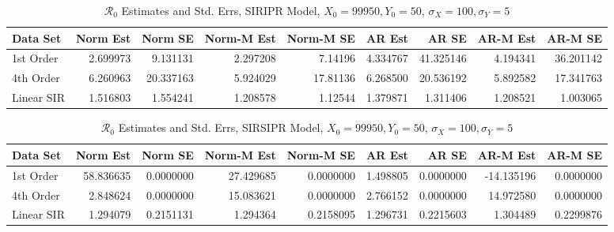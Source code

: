 \documentclass[12pt]{article}
\newcommand{\rr}{\ensuremath{\mathcal{R}_0}}
\begin{document}
\begin{table}[H]
	
	\caption{\label{tab:}$\rr$ Estimates and Std. Errs, SIRIPR Model,
		$X_0 = 99950, Y_0 = 50$, $\sigma_X = 100, \sigma_Y = 5$}
	\centering
	\begin{footnotesize}
	\begin{tabular}[t]{l|r|r|r|r|r|r|r|r}
		\hline
		Data Set & Norm Est & Norm SE & Norm-M Est & Norm-M SE & AR Est & AR SE & AR-M Est & AR-M SE\\
		\hline
		1st Order & 2.699973 & 9.131131 & 2.297208 & 7.14196 & 4.334767 & 41.325146 & 4.194341 & 36.201142\\
		\hline
		4th Order & 6.260963 & 20.337163 & 5.924029 & 17.81136 & 6.268500 & 20.536192 & 5.892582 & 17.341763\\
		\hline
		Linear SIR & 1.516803 & 1.554241 & 1.208578 & 1.12544 & 1.379871 & 1.311406 & 1.208521 & 1.003065\\
		\hline
	\end{tabular}
\end{footnotesize}
\end{table}
\begin{table}[H]
	
	\caption{\label{tab:}$\rr$ Estimates and Std. Errs, SIRSIPR Model,
		$X_0 = 99950, Y_0 = 50$, $\sigma_X = 100, \sigma_Y = 5$}
	\centering
	\begin{footnotesize}
	\begin{tabular}[t]{l|r|r|r|r|r|r|r|r}
		\hline
		Data Set & Norm Est & Norm SE & Norm-M Est & Norm-M SE & AR Est & AR SE & AR-M Est & AR-M SE\\
		\hline
		1st Order & 58.836635 & 0.0000000 & 27.429685 & 0.0000000 & 1.498805 & 0.0000000 & -14.135196 & 0.0000000\\
		\hline
		4th Order & 2.848624 & 0.0000000 & 15.083621 & 0.0000000 & 2.766152 & 0.0000000 & 14.972580 & 0.0000000\\
		\hline
		Linear SIR & 1.294079 & 0.2151131 & 1.294364 & 0.2158095 & 1.296731 & 0.2215603 & 1.304489 & 0.2299876\\
		\hline
	\end{tabular}
\end{footnotesize}
\end{table}
\end{document}

